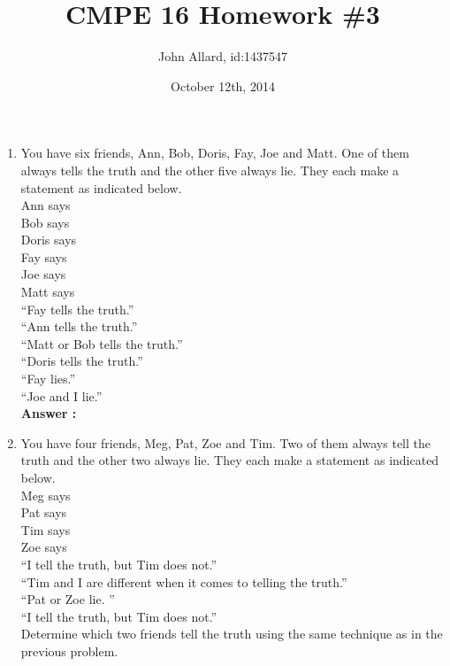 \documentclass[a4paper,11pt]{article}
\title{ CMPE 16 Homework \#3}
\author{John Allard, id:1437547}
\date{October 12th, 2014}
\begin{document}
\maketitle


\begin{enumerate}


\item You have six friends, Ann, Bob, Doris, Fay, Joe and Matt. One of them always tells the
truth and the other five always lie. They each make a statement as indicated below. \\
Ann says \\
Bob says \\
Doris says \\
Fay says \\
Joe says \\
Matt says \\
“Fay tells the truth.” \\
“Ann tells the truth.” \\
“Matt or Bob tells the truth.” \\
“Doris tells the truth.” \\
“Fay lies.” \\
“Joe and I lie.” \\

\textbf{Answer :}


\item You have four friends, Meg, Pat, Zoe and Tim. Two of them always tell the truth and the
other two always lie. They each make a statement as indicated below. \\
Meg says \\
Pat says \\
Tim says \\
Zoe says \\
“I tell the truth, but Tim does not.” \\
“Tim and I are different when it comes to telling the truth.” \\
“Pat or Zoe lie. ” \\
“I tell the truth, but Tim does not.” \\
Determine which two friends tell the truth using the same technique as in the previous problem. \\
\end{enumerate}
\end{document}

